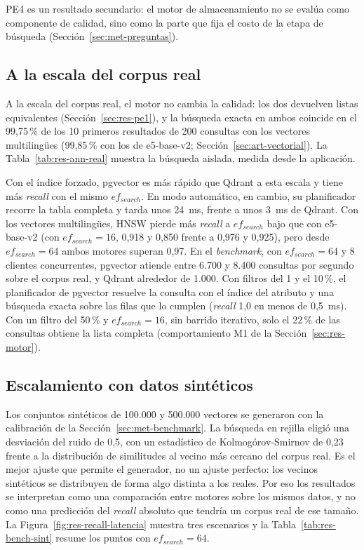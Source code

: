PE4 es un resultado secundario: el motor de almacenamiento no se evalúa como componente de calidad, sino como la parte que fija el costo de la etapa de búsqueda (Sección~\ref{sec:met-preguntas}).

\subsection{A la escala del corpus real}

A la escala del corpus real, el motor no cambia la calidad: los dos devuelven listas equivalentes (Sección~\ref{sec:res-pe1}), y la búsqueda exacta en ambos coincide en el 99,75\,\% de los 10 primeros resultados de 200 consultas con los vectores multilingües (99,85\,\% con los de e5-base-v2; Sección~\ref{sec:art-vectorial}). La Tabla~\ref{tab:res-ann-real} muestra la búsqueda aislada, medida desde la aplicación.



Con el índice forzado, pgvector es más rápido que Qdrant a esta escala y tiene más \textit{recall} con el mismo $ef_{search}$. En modo automático, en cambio, su planificador recorre la tabla completa y tarda unos 24~ms, frente a unos 3~ms de Qdrant. Con los vectores multilingües, HNSW pierde más \textit{recall} a $ef_{search}$ bajo que con e5-base-v2 (con $ef_{search} = 16$, 0,918 y 0,850 frente a 0,976 y 0,925), pero desde $ef_{search} = 64$ ambos motores superan 0,97. En el \textit{benchmark}, con $ef_{search} = 64$ y 8 clientes concurrentes, pgvector atiende entre 6.700 y 8.400 consultas por segundo sobre el corpus real, y Qdrant alrededor de 1.000. Con filtros del 1 y el 10\,\%, el planificador de pgvector resuelve la consulta con el índice del atributo y una búsqueda exacta sobre las filas que lo cumplen (\textit{recall} 1,0 en menos de 0,5~ms). Con un filtro del 50\,\% y $ef_{search} = 16$, sin barrido iterativo, solo el 22\,\% de las consultas obtiene la lista completa (comportamiento M1 de la Sección~\ref{sec:res-motor}).

\subsection{Escalamiento con datos sintéticos}

Los conjuntos sintéticos de 100.000 y 500.000 vectores se generaron con la calibración de la Sección~\ref{sec:met-benchmark}. La búsqueda en rejilla eligió una desviación del ruido de 0,5, con un estadístico de Kolmogórov-Smirnov de 0,23 frente a la distribución de similitudes al vecino más cercano del corpus real. Es el mejor ajuste que permite el generador, no un ajuste perfecto: los vecinos sintéticos se distribuyen de forma algo distinta a los reales. Por eso los resultados se interpretan como una comparación entre motores sobre los mismos datos, y no como una predicción del \textit{recall} absoluto que tendría un corpus real de ese tamaño. La Figura~\ref{fig:res-recall-latencia} muestra tres escenarios y la Tabla~\ref{tab:res-bench-sint} resume los puntos con $ef_{search} = 64$.

